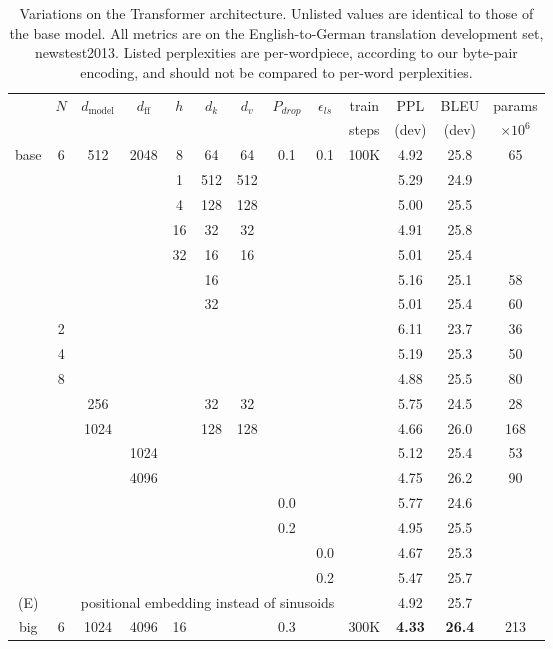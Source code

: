 \documentclass{article}
\newcommand{\dmodel}{d_{\text{model}}}
\newcommand{\dff}{d_{\text{ff}}}
\begin{document}
\begin{table}[t]
\caption{Variations on the Transformer architecture. Unlisted values are identical to those of the base model.  All metrics are on the English-to-German translation development set, newstest2013.  Listed perplexities are per-wordpiece, according to our byte-pair encoding, and should not be compared to per-word perplexities.}
\label{tab:variations}
\begin{center}
\vspace{-2mm}
\begin{tabular}{c|ccccccccc|ccc}
\hline\rule{0pt}{2.0ex}
 & \multirow{2}{*}{$N$} & \multirow{2}{*}{$\dmodel$} &
\multirow{2}{*}{$\dff$} & \multirow{2}{*}{$h$} & 
\multirow{2}{*}{$d_k$} & \multirow{2}{*}{$d_v$} & 
\multirow{2}{*}{$P_{drop}$} & \multirow{2}{*}{$\epsilon_{ls}$} &
train & PPL & BLEU & params \\
 & & & & & & & & & steps & (dev) & (dev) & $\times10^6$ \\
\hline\rule{0pt}{2.0ex}
base & 6 & 512 & 2048 & 8 & 64 & 64 & 0.1 & 0.1 & 100K & 4.92 & 25.8 & 65 \\
\hline\rule{0pt}{2.0ex}
\multirow{4}{*}{(A)}
& & & & 1 & 512 & 512 & & & & 5.29 & 24.9 &  \\
& & & & 4 & 128 & 128 & & & & 5.00 & 25.5 &  \\
& & & & 16 & 32 & 32 & & & & 4.91 & 25.8 &  \\
& & & & 32 & 16 & 16 & & & & 5.01 & 25.4 &  \\
\hline\rule{0pt}{2.0ex}
\multirow{2}{*}{(B)}
& & & & & 16 & & & & & 5.16 & 25.1 & 58 \\
& & & & & 32 & & & & & 5.01 & 25.4 & 60 \\
\hline\rule{0pt}{2.0ex}
\multirow{7}{*}{(C)}
& 2 & & & & & & & &            & 6.11 & 23.7 & 36 \\
& 4 & & & & & & & &            & 5.19 & 25.3 & 50 \\
& 8 & & & & & & & &            & 4.88 & 25.5 & 80 \\
& & 256 & & & 32 & 32 & & &    & 5.75 & 24.5 & 28 \\
& & 1024 & & & 128 & 128 & & & & 4.66 & 26.0 & 168 \\
& & & 1024 & & & & & &         & 5.12 & 25.4 & 53 \\
& & & 4096 & & & & & &         & 4.75 & 26.2 & 90 \\
\hline\rule{0pt}{2.0ex}
\multirow{4}{*}{(D)}
& & & & & & & 0.0 & & & 5.77 & 24.6 &  \\
& & & & & & & 0.2 & & & 4.95 & 25.5 &  \\
& & & & & & & & 0.0 & & 4.67 & 25.3 &  \\
& & & & & & & & 0.2 & & 5.47 & 25.7 &  \\
\hline\rule{0pt}{2.0ex}
(E) & & \multicolumn{7}{c}{positional embedding instead of sinusoids} & & 4.92 & 25.7 & \\
\hline\rule{0pt}{2.0ex}
big & 6 & 1024 & 4096 & 16 & & & 0.3 & & 300K & \textbf{4.33} & \textbf{26.4} & 213 \\
\hline
\end{tabular}
\end{center}
\end{table}
\end{document}
